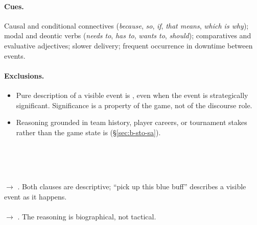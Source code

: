 \paragraph{Cues.} Causal and conditional connectives (\emph{because},
\emph{so}, \emph{if}, \emph{that means}, \emph{which is why}); modal and
deontic verbs (\emph{needs to}, \emph{has to}, \emph{wants to},
\emph{should}); comparatives and evaluative adjectives; slower delivery;
frequent occurrence in downtime between events.

\paragraph{Exclusions.}
\begin{itemize}
  \item Pure description of a visible event is \PBP{}, even when the
    event is strategically significant. Significance is a property of
    the game, not of the discourse role.
  \item Reasoning grounded in team history, player careers, or
    tournament stakes rather than the game state is \STO{}
    (\S\ref{sec:b-sto-sa}).
\end{itemize}

\begin{agexample}
\\[2pt]
\\[2pt]
\end{agexample}

\begin{agexample}
\\
\hspace*{1em}$\rightarrow$ \PBP{}. Both clauses are descriptive; ``pick up this blue buff'' describes a visible event as it happens.\\[4pt]
\\
\hspace*{1em}$\rightarrow$ \STO{}. The reasoning is biographical, not
tactical.
\end{agexample}

